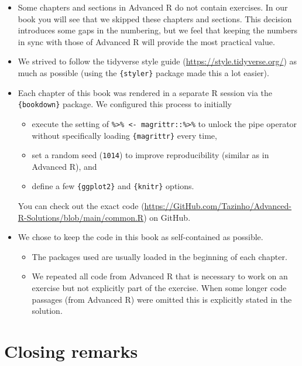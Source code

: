 \documentclass[
]{krantz}
\providecommand{\tightlist}{%
  \setlength{\itemsep}{0pt}\setlength{\parskip}{0pt}}
\renewcommand{\href}[2]{#2 (\url{#1})}
\begin{document}
\begin{itemize}
\tightlist
\item
  Some chapters and sections in Advanced R do not contain exercises. In our book you will see that we skipped these chapters and sections. This decision introduces some gaps in the numbering, but we feel that keeping the numbers in sync with those of Advanced R will provide the most practical value.
\item
  We strived to follow the \href{https://style.tidyverse.org/}{tidyverse style guide} as much as possible (using the \texttt{\{styler\}} package made this a lot easier).
\item
  Each chapter of this book was rendered in a separate R session via the \texttt{\{bookdown\}} package. We configured this process to initially

  \begin{itemize}
  \tightlist
  \item
    execute the setting of \texttt{\textasciigrave{}\%\textgreater{}\%\textasciigrave{}\ \textless{}-\ magrittr::\textasciigrave{}\%\textgreater{}\%\textasciigrave{}} to unlock the pipe operator without specifically loading \texttt{\{magrittr\}} every time,
  \item
    set a random seed (\texttt{1014}) to improve reproducibility (similar as in Advanced R), and
  \item
    define a few \texttt{\{ggplot2\}} and \texttt{\{knitr\}} options.
  \end{itemize}

  You can check out the \href{https://GitHub.com/Tazinho/Advanced-R-Solutions/blob/main/common.R}{exact code} on GitHub.
\item
  We chose to keep the code in this book as self-contained as possible.

  \begin{itemize}
  \tightlist
  \item
    The packages used are usually loaded in the beginning of each chapter.
  \item
    We repeated all code from Advanced R that is necessary to work on an exercise but not explicitly part of the exercise. When some longer code passages (from Advanced R) were omitted this is explicitly stated in the solution.
  \end{itemize}
\end{itemize}

\hypertarget{closing-remarks}{%
\section{Closing remarks}\label{closing-remarks}}
\end{document}
